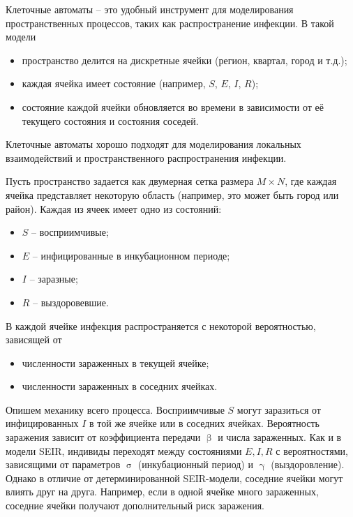 \documentclass[a4paper, 14pt]{extreport}
\renewcommand{\beta}{\upbeta}
\renewcommand{\gamma}{\upgamma}
\renewcommand{\sigma}{\upsigma}
\begin{document}
	Клеточные автоматы -- это удобный инструмент для моделирования пространственных процессов, таких как распространение инфекции. В такой модели
	
	\begin{itemize}
		\item пространство делится на дискретные ячейки (регион, квартал, город и т.д.);
		\item каждая ячейка имеет состояние (например, $S$, $E$, $I$, $R$);
		\item состояние каждой ячейки обновляется во времени в зависимости от её текущего состояния и состояния соседей.
	\end{itemize}
	
	Клеточные автоматы хорошо подходят для моделирования локальных взаимодействий и пространственного распространения инфекции.
	
	Пусть пространство задается как двумерная сетка размера $M\times N$, где каждая ячейка представляет некоторую область (например, это может быть город или район).
	Каждая из ячеек имеет одно из состояний:
	\begin{itemize}
		\item $S$ -- восприимчивые;
		\item $E$ -- инфицированные в инкубационном периоде;
		\item $I$ -- заразные;
		\item $R$ -- выздоровевшие.
	\end{itemize}
	В каждой ячейке инфекция распространяется с некоторой вероятностью, зависящей от
	\begin{itemize}
		\item численности зараженных в текущей ячейке;
		\item численности зараженных в соседних ячейках.
	\end{itemize}
	Опишем механику всего процесса.
	Восприимчивые $S$ могут заразиться от инфицированных $I$ в той же ячейке или в соседних ячейках. Вероятность заражения зависит от коэффициента передачи $\beta$ и числа зараженных.
	Как и в модели SEIR, индивиды переходят между состояниями $E, I, R$ с вероятностями, зависящими от параметров $\sigma$ (инкубационный период) и $\gamma$ (выздоровление).
	Однако в отличие от детерминированной SEIR-модели, соседние ячейки могут влиять друг на друга. Например, если в одной ячейке много зараженных, соседние ячейки получают дополнительный риск заражения.
\end{document}
